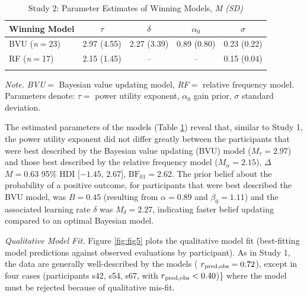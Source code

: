 \documentclass[
  a4paper, man, floatsintext]{apa6}
\begin{document}
\begin{table}[tbp]

\begin{center}
\begin{threeparttable}

\caption{\label{tab:parameter_study2}Study 2: Parameter Estimates of Winning Models, \textit{M (SD)}}

\begin{tabular}{lcccc}
\toprule
Winning Model & $\tau$ & $\delta$ & $\alpha_0$ & $\sigma$\\
\midrule
BVU (\textit{n}$=$23) & 2.97 (4.55) & 2.27 (3.39) & 0.89 (0.80) & 0.23 (0.22)\\
RF (\textit{n}$=$17) & 2.15 (1.45) & -- & -- & 0.15 (0.04)\\
\bottomrule
\addlinespace
\end{tabular}

\begin{tablenotes}[para]
\normalsize{\textit{Note.} \textit{BVU}$=$ Bayesian value updating model, \textit{RF}$=$ relative frequency model. Parameters denote: $\tau=$ power utility exponent, $\alpha_0$ gain prior, $\sigma$ standard deviation.}
\end{tablenotes}

\end{threeparttable}
\end{center}

\end{table}

The estimated parameters of the models (Table
\ref{tab:parameter_study2}) reveal that, similar to Study 1, the power
utility exponent did not differ greatly between the participants that
were best described by the Bayesian value updating (BVU) model
(\(M_{\tau}= 2.97\)) and those best described by the relative frequency
model (\(M_{\alpha}=2.15\)), \(\Delta\) \(M = 0.63\) 95\% HDI
\([-1.45\), \(2.67]\), \(\mathrm{BF}_{\textrm{01}} = 2.62\). The prior
belief about the probability of a positive outcome, for participants
that were best described the BVU model, was \(B = 0.45\) (resulting from
\(\alpha = 0.89\) and \(\beta_0 = 1.11\)) and the associated learning
rate \(\delta\) was \(M_{\delta}=2.27\), indicating faster belief
updating compared to an optimal Bayesian model.

\textit{Qualitative Model Fit.} Figure \ref{fig:fig5} plots the
qualitative model fit (best-fitting model predictions against observed
evaluations by participant). As in Study 1, the data are generally
well-described by the models (
\(r\textsubscript{pred,obs} = 0.72\)), except in four cases
(participants s42, s54, s67, with
\(r\textsubscript{pred,obs} < 0.40\))\} where the model must be rejected
because of qualitative mis-fit.
\end{document}
